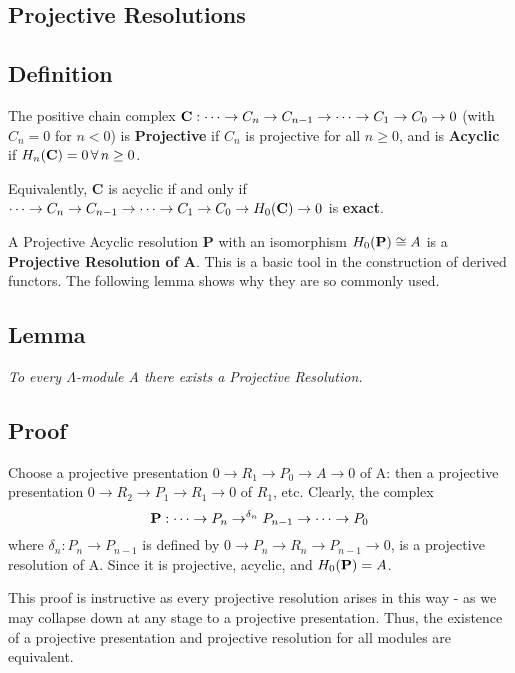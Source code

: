 \subsection{Projective Resolutions}\label{df1.3}
\subsection{Definition}\label{df1.3.1}
The positive chain complex $\textbf C:\dots\rightarrow
C_n\rightarrow C_{n-1} \rightarrow \dots \rightarrow C_1
\rightarrow C_0 \rightarrow 0$ (with $C_n = 0$ for $n<0$) is
\textbf{Projective} if $C_n$ is projective for all $n\geq 0$, and
is \textbf{Acyclic} if $H_n(\textbf C) = 0 \,\forall\, n\geq 0$.

Equivalently, \textbf C is acyclic if and only if
$\dots\rightarrow C_n\rightarrow C_{n-1}\rightarrow \dots
\rightarrow C_1\rightarrow C_0 \rightarrow H_0(\textbf C)
\rightarrow 0$ is \textbf{exact}.

A Projective Acyclic resolution \textbf P with an isomorphism
$H_0(\textbf P) \cong A$ is a \textbf{Projective Resolution of A}.
This is a basic tool in the construction of derived functors. The
following lemma shows why they are so commonly used.

\subsection{Lemma}\label{df1.3.2}
\emph{To every $\Lambda$-module A there exists a Projective
Resolution.}
\subsection*{Proof}
Choose a projective presentation $0\rightarrow R_1\rightarrow P_0
\rightarrow A\rightarrow 0$ of A: then a projective presentation
$0\rightarrow R_2 \rightarrow P_1\rightarrow R_1\rightarrow 0$ of
$R_1$, etc. Clearly, the complex
$$\textbf P:\dots \rightarrow P_n\rightarrow^{\delta_n} P_{n-1}
\rightarrow \dots \rightarrow P_0$$ where $\delta_n:P_n\rightarrow
P_{n-1}$ is defined by $0\rightarrow P_n \rightarrow R_n
\rightarrow P_{n-1}\rightarrow 0$, is a projective resolution of
A. Since it is projective, acyclic, and $H_0(\textbf P) = A$.

This proof is instructive as every projective resolution arises in
this way - as we may collapse down at any stage to a projective
presentation. Thus, the existence of a projective presentation and
projective resolution for all modules are equivalent.

